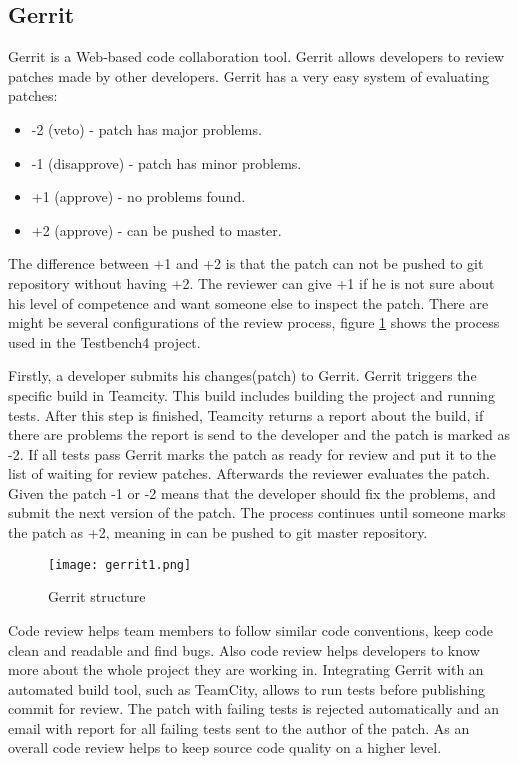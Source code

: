 \subsection{Gerrit}
\label{sec:gerrit}
  Gerrit is a Web-based code collaboration tool. Gerrit allows developers to
  review patches made by other developers. Gerrit has a very easy system of evaluating patches:
  \begin{itemize}
  \item -2 (veto) - patch has major problems.
  \item -1 (disapprove) - patch has minor problems.
  \item +1 (approve) - no problems found.
  \item +2 (approve) - can be pushed to master.
  \end{itemize}
  
  The difference between +1 and +2 is that the patch can not be pushed to git
  repository without having +2. The reviewer can give +1 if he is not sure about his level of competence
  and want someone else to inspect the patch. 
  There are might be several configurations of the review process,
  figure \ref{fig:gerritTestbench} shows the process used in the
  Testbench4 project.

  Firstly, a developer submits his changes(patch) to Gerrit. Gerrit triggers the
  specific build in Teamcity. This build includes building the project and
  running tests. After this step is finished, Teamcity returns a report about the build,
  if there are problems the report is send to the developer and the patch is marked as -2. If all
  tests pass Gerrit marks the patch as ready for review and put it to the list
  of waiting for review patches.
  Afterwards the reviewer evaluates the patch. Given the patch -1 or -2 means
  that the developer should fix the problems, and submit the next version of the patch. 
  The process continues until someone  marks the patch as +2,
    meaning in can be pushed to git master repository.
    \begin{figure}
      \texttt{[image: gerrit1.png]}
      \label{fig:gerritTestbench}
      \caption{Gerrit structure}
    \end{figure}
    
  Code review helps team members to follow similar code conventions, 
  keep code clean and readable and find bugs. Also code review helps developers to know more about 
  the whole project they are working in. Integrating Gerrit with an automated build tool, 
  such as TeamCity, allows to run tests before publishing commit for review. 
  The patch with failing tests is rejected automatically and an email with report
   for all failing tests sent to the author of the patch. 
   As an overall code review helps to keep source code quality on a higher level.

